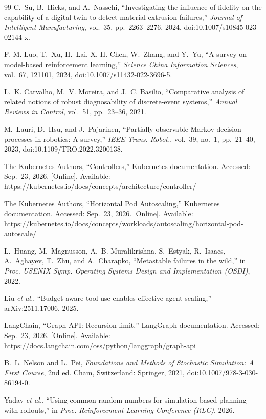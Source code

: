 \documentclass[conference]{IEEEtran}
\begin{document}
\begin{thebibliography}{99}
 C.~Su, B.~Hicks, and A.~Nassehi, ``Investigating the influence of fidelity on the capability of a digital twin to detect material extrusion failures,'' \emph{Journal of Intelligent Manufacturing}, vol.~35, pp.~2263--2276, 2024, doi:10.1007/s10845-023-02144-x.

 F.-M. Luo, T.~Xu, H.~Lai, X.-H. Chen, W.~Zhang, and Y.~Yu, ``A survey on model-based reinforcement learning,'' \emph{Science China Information Sciences}, vol.~67, 121101, 2024, doi:10.1007/s11432-022-3696-5.

 L.~K. Carvalho, M.~V. Moreira, and J.~C. Basilio, ``Comparative analysis of related notions of robust diagnosability of discrete-event systems,'' \emph{Annual Reviews in Control}, vol.~51, pp.~23--36, 2021.

 M.~Lauri, D.~Hsu, and J.~Pajarinen, ``Partially observable Markov decision processes in robotics: A survey,'' \emph{IEEE Trans. Robot.}, vol.~39, no.~1, pp.~21--40, 2023, doi:10.1109/TRO.2022.3200138.

 The Kubernetes Authors, ``Controllers,'' Kubernetes documentation. Accessed: Sep.~23, 2026. [Online]. Available: \url{https://kubernetes.io/docs/concepts/architecture/controller/}

 The Kubernetes Authors, ``Horizontal Pod Autoscaling,'' Kubernetes documentation. Accessed: Sep.~23, 2026. [Online]. Available: \url{https://kubernetes.io/docs/concepts/workloads/autoscaling/horizontal-pod-autoscale/}

 L.~Huang, M.~Magnusson, A.~B. Muralikrishna, S.~Estyak, R.~Isaacs, A.~Aghayev, T.~Zhu, and A.~Charapko, ``Metastable failures in the wild,'' in \emph{Proc. USENIX Symp. Operating Systems Design and Implementation (OSDI)}, 2022.

 Liu \emph{et al.}, ``Budget-aware tool use enables effective agent scaling,'' arXiv:2511.17006, 2025.

 LangChain, ``Graph API: Recursion limit,'' LangGraph documentation. Accessed: Sep.~23, 2026. [Online]. Available: \url{https://docs.langchain.com/oss/python/langgraph/graph-api}

 B.~L. Nelson and L.~Pei, \emph{Foundations and Methods of Stochastic Simulation: A First Course}, 2nd ed. Cham, Switzerland: Springer, 2021, doi:10.1007/978-3-030-86194-0.

 Yadav \emph{et al.}, ``Using common random numbers for simulation-based planning with rollouts,'' in \emph{Proc. Reinforcement Learning Conference (RLC)}, 2026.


\end{thebibliography}
\end{document}
